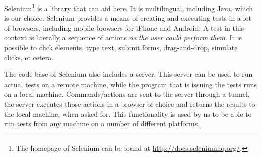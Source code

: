 Selenium\footnote{The homepage of Selenium can be found at \url{http://docs.seleniumhq.org/}.} is a library that can aid here. It is multilingual, including Java, which is our choice. Selenium provides a means of creating and executing tests in a lot of browsers, including mobile browsers for iPhone and Android. A test in this context is literally a sequence of actions \emph{as the user could perform them}. It is possible to click elements, type text, submit forms, drag-and-drop, simulate clicks, et cetera.

The code base of Selenium also includes a server. This server can be used to run actual tests on a remote machine, while the program that is issuing the tests runs on a local machine. Commands/actions are sent to the server through a tunnel, the server executes those actions in a browser of choice and returns the results to the local machine, when asked for. This functionality is used by us to be able to run tests from any machine on a number of different platforms.